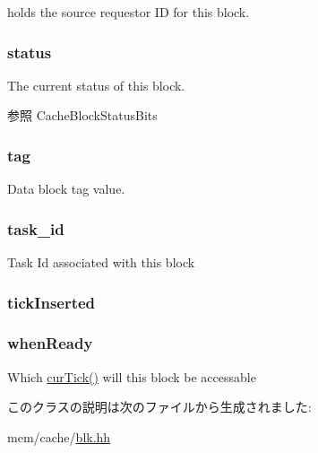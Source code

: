 \label{classCacheBlk_ab4fab3e5850df5c3ff6cf55f1517a4ad}
holds the source requestor ID for this block. \hypertarget{classCacheBlk_aa54219f67be2dfea4379acbaf99d9e4d}{
\subsubsection[{status}]{ {\bf status}}}
\label{classCacheBlk_aa54219f67be2dfea4379acbaf99d9e4d}
The current status of this block. \begin{DoxySeeAlso}{参照}
CacheBlockStatusBits 
\end{DoxySeeAlso}
\hypertarget{classCacheBlk_a37fe97093e3df5a68f35c18538628836}{
\subsubsection[{tag}]{ {\bf tag}}}
\label{classCacheBlk_a37fe97093e3df5a68f35c18538628836}
Data block tag value. \hypertarget{classCacheBlk_a9956f784c0c9fae2e20cbedeff5decfb}{
\subsubsection[{task\_\-id}]{ {\bf task\_\-id}}}
\label{classCacheBlk_a9956f784c0c9fae2e20cbedeff5decfb}
Task Id associated with this block \hypertarget{classCacheBlk_a238d11cc885d0b7adbaefef41a882bd8}{
\subsubsection[{tickInserted}]{ {\bf tickInserted}}}
\label{classCacheBlk_a238d11cc885d0b7adbaefef41a882bd8}
\hypertarget{classCacheBlk_a8ec4c113348c43bd822d59bc1f20e70b}{
\subsubsection[{whenReady}]{ {\bf whenReady}}}
\label{classCacheBlk_a8ec4c113348c43bd822d59bc1f20e70b}
Which \hyperlink{statistics_8hh_a7acdccbf0d35ce0c159c0cdd36371b22}{curTick()} will this block be accessable 

このクラスの説明は次のファイルから生成されました:\begin{DoxyCompactItemize}
\item 
mem/cache/\hyperlink{blk_8hh}{blk.hh}\end{DoxyCompactItemize}
